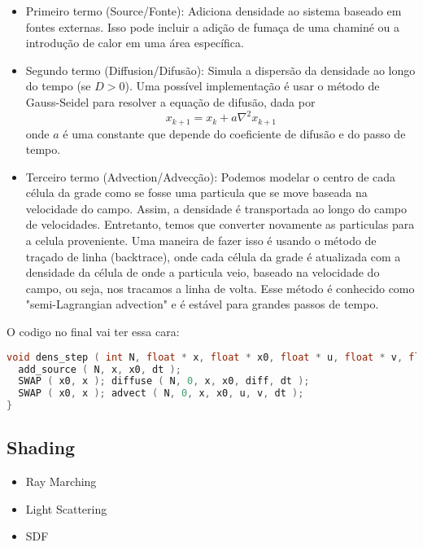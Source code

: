 \begin{itemize}
  \item Primeiro termo (Source/Fonte): Adiciona densidade ao sistema baseado em fontes externas. Isso pode incluir a adição de fumaça de uma chaminé ou a introdução de calor em uma área específica.
  \item Segundo termo (Diffusion/Difusão): Simula a dispersão da densidade ao longo do tempo (se $D > 0$). Uma possível implementação é usar o método de Gauss-Seidel para resolver a equação de difusão, dada por 
    $$
    x_{k+1} = x_k + a \nabla^2 x_{k+1}
    $$
    onde $a$ é uma constante que depende do coeficiente de difusão e do passo de tempo.
  \item Terceiro termo (Advection/Advecção): Podemos modelar o centro de cada célula da grade como se fosse uma particula que se move baseada na velocidade do campo. Assim, a densidade é transportada ao longo do campo de velocidades. Entretanto, temos que converter novamente as particulas para a celula proveniente. Uma maneira de fazer isso é usando o método de traçado de linha (backtrace), onde cada célula da grade é atualizada com a densidade da célula de onde a particula veio, baseado na velocidade do campo, ou seja, nos tracamos a linha de volta. Esse método é conhecido como "semi-Lagrangian advection" e é estável para grandes passos de tempo.

\end{itemize}

O codigo no final vai ter essa cara:
\begin{lstlisting}[language=C]
void dens_step ( int N, float * x, float * x0, float * u, float * v, float diff, float dt ) {
  add_source ( N, x, x0, dt );
  SWAP ( x0, x ); diffuse ( N, 0, x, x0, diff, dt );
  SWAP ( x0, x ); advect ( N, 0, x, x0, u, v, dt );
}
\end{lstlisting}

\subsection{Shading}
\begin{itemize}
  \item Ray Marching
  \item Light Scattering 
  \item SDF
\end{itemize}


